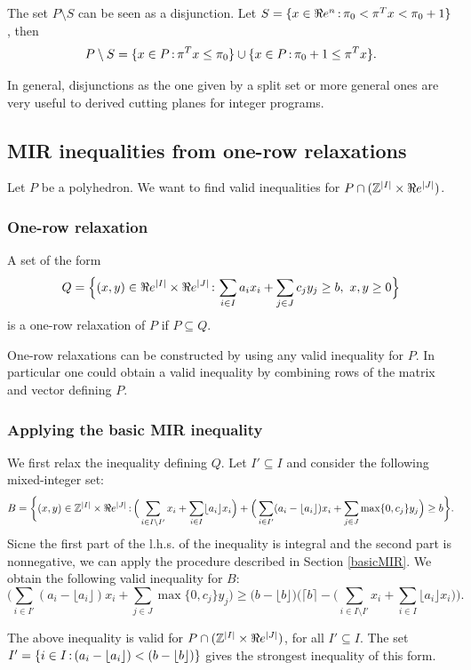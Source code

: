 \begin{remark}{}{}
The set $P\setminus S$ can be seen as a disjunction. Let $S=\{x\in\Re e^n{\,:\,} \pi_0<\pi^Tx<\pi_0+1\}$, then
$$P\setminus S=\{x\in P{\,:\,} \pi^Tx\leq \pi_0\} \cup \{x\in P{\,:\,}\pi_0 +1\leq  \pi^Tx\}.$$

In general, disjunctions as the one given by a split set or more general ones are very useful to derived cutting planes for integer programs.
\end{remark}








\subsection{MIR inequalities from one-row relaxations}
Let $P$ be a polyhedron. We want to find valid inequalities for $P\cap ({\mathbb{Z}}^{|I|}\times \Re e^{|J|})$. 
\subsubsection{One-row relaxation}
A set of the form 
$$Q=\Big\{(x,y)\in \Re e^{|I|}\times \Re e^{|J|}{\,:\,} \sum_{i\in I}a_ix_i+\sum_{j\in J}c_jy_j\geq b,\ x,y\geq0\Big\}$$ 
is a one-row relaxation of $P$ if $P\subseteq Q$. 
\begin{remark}{}{}
One-row relaxations can be constructed by using any valid inequality for $P$. In particular one could obtain a valid inequality by combining rows of the matrix  and vector defining $P$.
\end{remark}
\subsubsection{Applying the basic MIR inequality}
We first relax the inequality defining $Q$. Let $I'\subseteq I$ and  consider the following mixed-integer set:
$$B=\bigg\{(x,y)\in {\mathbb{Z}}^{|I|}\times \Re e^{|J|}{\,:\,}\Big(\sum_{i\in I\setminus I'}x_i + \sum_{i\in I}\lfloor a_i\rfloor x_i\Big)+\Big(\sum_{i\in I'}(a_i-\lfloor a_i\rfloor)x_i+ \sum_{j\in J}\max\{0,c_j\}y_j\Big)\geq b\bigg\}.$$
Sicne the first part of the l.h.s. of the inequality is integral and the second part is nonnegative, we can apply the procedure described in Section \ref{basicMIR}. We obtain the following valid inequality for $B$:
$$\Big(\sum_{i\in I'}(a_i-\lfloor a_i\rfloor)x_i+ \sum_{j\in J}\max\{0,c_j\}y_j\Big)\geq \big(b-\lfloor b \rfloor\big)\bigg(\lceil b\rceil - \Big(\sum_{i\in I\setminus I'}x_i + \sum_{i\in I}\lfloor a_i\rfloor x_i\Big)\bigg).$$
\begin{remark}{}{}
The above inequality is valid for $P\cap ({\mathbb{Z}}^{|I|}\times \Re e^{|J|})$, for all $I'\subseteq I$. The set $I'=\{i\in I{\,:\,} (a_i-\lfloor a_i\rfloor)<(b-\lfloor b\rfloor)\}$ gives the strongest inequality of this form.
\end{remark}

